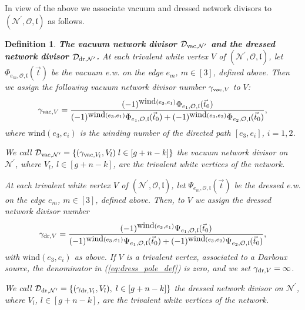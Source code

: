 \documentclass[11pt]{amsart}
\theoremstyle{plain}
\numberwithin{equation}{section}
\newtheorem{definition}{Definition}[subsection]
\def \DVN {{\mathcal D}_{\textup{\scriptsize vac},{\mathcal N}^{\prime}}}
\def \DDN {{\mathcal D}_{\textup{\scriptsize dr},{\mathcal N}^{\prime}}}
\def \gvac {\gamma_{\textup{\scriptsize vac},V_l}}
\def \gdr {\gamma_{\textup{\scriptsize dr},V_l}}
\begin{document}
In view of the above we associate vacuum and dressed network divisors to $({\mathcal N}^{\prime},\mathcal O, \mathfrak l)$ as follows.

\begin{definition}\label{def:vac_div_gen}\textbf{The vacuum network divisor $\DVN$ and the dressed network divisor $\DDN$.}
At each trivalent white vertex $V$ of $({\mathcal N}^{\prime},\mathcal O,\mathfrak l)$, 
let $\Phi_{e_m, \mathcal O,\mathfrak l} (\vec t)$ be the vacuum e.w. on the edge $e_m$, $m\in [3]$, defined above. Then
we assign the following vacuum network divisor number $\gamma_{\textup{\scriptsize vac},V}$ to $V$: 
\begin{equation}\label{eq:vac_pole_def}
\gamma_{\textup{\scriptsize vac},V} = \frac{(-1)^{\mbox{wind}(e_3, e_1)} \Phi_{e_1,\mathcal O,\mathfrak l} (\vec t_0) }{(-1)^{\mbox{wind}(e_3, e_1)} \Phi_{e_1,\mathcal O,\mathfrak l} (\vec t_0)+(-1)^{\mbox{wind}(e_3, e_2)} \Phi_{e_2,\mathcal O,\mathfrak l} (\vec t_0)},
\end{equation}
where $\mbox{wind}(e_3,e_i)$ is the winding number of the directed path $[e_3,e_i]$, $i=1,2$.

We call $\DVN= \{ (\gvac, V_l) \; l\in [g+n-k]  \}$ the vacuum network divisor on ${\mathcal N}^{\prime}$, where $V_l$, $l\in [g+n-k]$, are the trivalent white vertices of the network.

At each trivalent white vertex $V$ of $({\mathcal N}^{\prime},\mathcal O,\mathfrak l)$, 
let $\Psi_{e_m, \mathcal O,\mathfrak l} (\vec t)$ be the dressed e.w. on the edge $e_m$, $m\in [3]$, defined above. Then, to $V$ we assign the dressed network divisor number 
\begin{equation}\label{eq:dress_pole_def}
\gamma_{\textup{\scriptsize dr},V} = \frac{(-1)^{\mbox{wind}(e_3, e_1)} \Psi_{e_1,\mathcal O,\mathfrak l} (\vec t_0) }{(-1)^{\mbox{wind}(e_3, e_1)} \Psi_{e_1,\mathcal O,\mathfrak l} (\vec t_0)+(-1)^{\mbox{wind}(e_3, e_2)} \Psi_{e_2,\mathcal O,\mathfrak l} (\vec t_0)},
\end{equation}
with $\mbox{wind}(e_3,e_i)$ as above. If $V$ is a trivalent vertex, associated to a Darboux source, the denominator in (\ref{eq:dress_pole_def}) is 
zero, and we set $\gamma_{\textup{\scriptsize dr},V}=\infty$.

We call $\DDN = \{ (\gdr, V_l), \; l\in [g+n-k]  \}$ the dressed network divisor on ${\mathcal N}^{\prime}$, where $V_l$, $l\in [g+n-k]$, are the trivalent white vertices of the network.
\end{definition}
\end{document}
